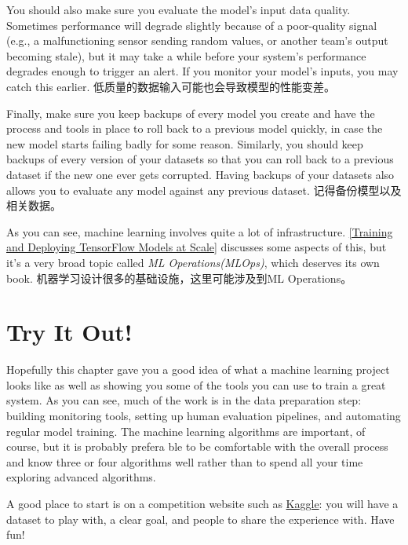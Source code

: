 You should also make sure you evaluate the model's input data quality. Sometimes performance will degrade slightly because of a poor-quality signal (e.g., a malfunctioning sensor sending random values, or another team's output becoming stale), but it may take a while before your system's performance degrades enough to trigger an alert. If you monitor your model's inputs, you may catch this earlier. 低质量的数据输入可能也会导致模型的性能变差。

Finally, make sure you keep backups of every model you create and have the process and tools in place to roll back to a previous model quickly, in case the new model starts failing badly for some reason. Similarly, you should keep backups of every version of your datasets so that you can roll back to a previous dataset if the new one ever gets corrupted. Having backups of your datasets also allows you to evaluate any model against any previous dataset. 记得备份模型以及相关数据。

As you can see, machine learning involves quite a lot of infrastructure. \autoref{Training and Deploying TensorFlow Models at Scale}  discusses some aspects of this, but it's a very broad topic called \emph{ML Operations(MLOps)}, which deserves its own book. 机器学习设计很多的基础设施，这里可能涉及到ML Operations。
\section{Try It Out!}
Hopefully this chapter gave you a good idea of what a machine learning project looks like as well as showing you some of the tools you can use to train a great system. As you can see, much of the work is in the data preparation step: building monitoring tools, setting up human evaluation pipelines, and automating regular model training. The machine learning algorithms are important, of course, but it is probably prefera ble to be comfortable with the overall process and know three or four algorithms well rather than to spend all your time exploring advanced algorithms.

A good place to start is on a competition website such as \href{https://www.kaggle.com/}{Kaggle}: you will have a dataset to play with, a clear goal, and people to share the experience with. Have fun!
